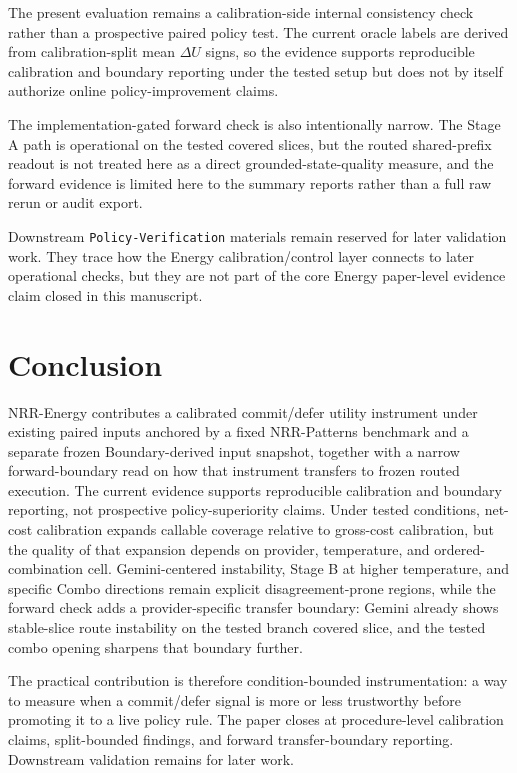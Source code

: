 \documentclass[11pt,a4paper]{article}
\begin{document}
The present evaluation remains a calibration-side internal consistency check
rather than a prospective paired policy test. The current oracle labels are
derived from calibration-split mean $\Delta U$ signs, so the evidence supports
reproducible calibration and boundary reporting under the tested setup but does
not by itself authorize online policy-improvement claims.

The implementation-gated forward check is also intentionally narrow. The
Stage A path is operational on the tested covered slices, but the
routed shared-prefix readout is not treated here as a direct grounded-state-quality
measure, and the forward evidence is limited here to the summary
reports rather than a full raw rerun or audit export.

Downstream \texttt{Policy-Verification} materials remain reserved for later
validation work. They trace how the Energy calibration/control layer connects
to later operational checks, but they are not part of the core Energy
paper-level evidence claim closed in this manuscript.

\section{Conclusion}
\label{sec:conclusion}

NRR-Energy contributes a calibrated commit/defer utility instrument under
existing paired inputs anchored by a fixed NRR-Patterns benchmark and a
separate frozen Boundary-derived input snapshot, together with a narrow
forward-boundary read on how that instrument transfers to frozen routed
execution. The current evidence supports reproducible calibration and boundary
reporting, not prospective policy-superiority claims. Under tested conditions,
net-cost calibration expands callable coverage relative to gross-cost
calibration, but the quality of that expansion depends on provider,
temperature, and ordered-combination cell. Gemini-centered instability, Stage
B at higher temperature, and specific Combo directions remain explicit
disagreement-prone regions, while the forward check adds a provider-specific
transfer boundary: Gemini already shows stable-slice route instability on the
tested branch covered slice, and the tested combo opening sharpens that
boundary further.

The practical contribution is therefore condition-bounded instrumentation: a
way to measure when a commit/defer signal is more or less trustworthy before
promoting it to a live policy rule. The paper closes at procedure-level
calibration claims, split-bounded findings, and forward transfer-boundary
reporting. Downstream validation remains for later work.
\end{document}
